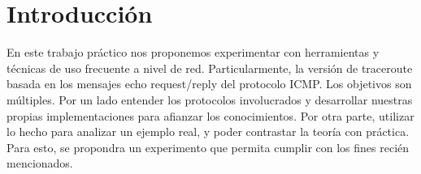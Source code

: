 \section{Introducción}

En este trabajo práctico nos proponemos experimentar con herramientas y técnicas de uso frecuente a
nivel de red. Particularmente, la versión de traceroute basada en los mensajes echo request/reply del
protocolo ICMP. Los objetivos son múltiples. Por un lado entender los protocolos involucrados y
desarrollar nuestras propias implementaciones para afianzar los conocimientos. Por otra parte, utilizar lo hecho para analizar un ejemplo real, y poder contrastar la teoría con práctica. Para esto, se propondra un experimento que permita cumplir con los fines recién mencionados.